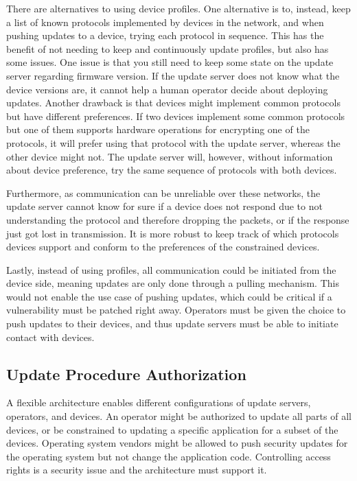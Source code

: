 \documentclass[0-thesis.tex]{subfiles}
\begin{document}
There are alternatives to using device profiles. One alternative is to, instead, keep a
list of known protocols implemented by devices in the network, and when pushing updates to
a device, trying each protocol in sequence. This has the benefit of not needing to keep
and continuously update profiles, but also has some issues. One issue is that you still
need to keep some state on the update server regarding firmware version. If the update
server does not know what the device versions are, it cannot help a human operator decide
about deploying updates. Another drawback is that devices might implement common protocols
but have different preferences. If two devices implement some common protocols but one of
them supports hardware operations for encrypting one of the protocols, it will prefer
using that protocol with the update server, whereas the other device might not. The update
server will, however, without information about device preference, try the same sequence of
protocols with both devices.

Furthermore, as communication can be unreliable over these networks, the update server
cannot know for sure if a device does not respond due to not understanding the protocol
and therefore dropping the packets, or if the response just got lost in transmission. It
is more robust to keep track of which protocols devices support and conform to the
preferences of the constrained devices.

Lastly, instead of using profiles, all communication could be initiated from the device
side, meaning updates are only done through a pulling mechanism. This would not enable the
use case of pushing updates, which could be critical if a vulnerability must be patched
right away. Operators must be given the choice to push updates to their devices, and thus
update servers must be able to initiate contact with devices.

\subsection{Update Procedure Authorization}
\label{ssec:authorization}
A flexible architecture enables different configurations of update servers, operators, and
devices. An operator might be authorized to update all parts of all devices, or be
constrained to updating a specific application for a subset of the devices. Operating
system vendors might be allowed to push security updates for the operating system but not
change the application code. Controlling access rights is a security issue and the
architecture must support it.
\end{document}
